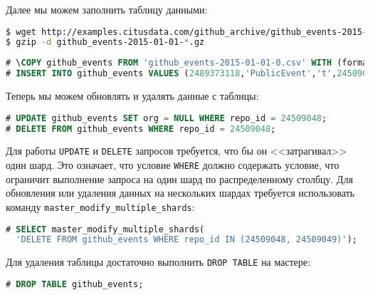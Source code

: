 Далее мы можем заполнить таблицу данными:

\begin{lstlisting}[language=Bash,label=lst:citus_hash3,caption=Загрузка данных]
$ wget http://examples.citusdata.com/github_archive/github_events-2015-01-01-{0..5}.csv.gz
$ gzip -d github_events-2015-01-01-*.gz
\end{lstlisting}

\begin{lstlisting}[language=SQL,label=lst:citus_hash4,caption=Загрузка данных]
# \COPY github_events FROM 'github_events-2015-01-01-0.csv' WITH (format CSV)
# INSERT INTO github_events VALUES (2489373118,'PublicEvent','t',24509048,'{}','{"id": 24509048, "url": "https://api.github.com/repos/SabinaS/csee6868", "name": "SabinaS/csee6868"}','{"id": 2955009, "url": "https://api.github.com/users/SabinaS", "login": "SabinaS", "avatar_url": "https://avatars.githubusercontent.com/u/2955009?", "gravatar_id": ""}',NULL,'2015-01-01 00:09:13');
\end{lstlisting}

Теперь мы можем обновлять и удалять данные с таблицы:

\begin{lstlisting}[language=SQL,label=lst:citus_hash5,caption=Изменение данных]
# UPDATE github_events SET org = NULL WHERE repo_id = 24509048;
# DELETE FROM github_events WHERE repo_id = 24509048;
\end{lstlisting}

Для работы \lstinline!UPDATE! и \lstinline!DELETE! запросов требуется, что бы он <<затрагивал>> один шард. Это означает, что условие \lstinline!WHERE! должно содержать условие, что ограничит выполнение запроса на один шард по распределенному столбцу. Для обновления или удаления данных на нескольких шардах требуется использовать команду \lstinline!master_modify_multiple_shards!:

\begin{lstlisting}[language=SQL,label=lst:citus_hash6,caption=Изменение данных на нескольких шардах]
# SELECT master_modify_multiple_shards(
  'DELETE FROM github_events WHERE repo_id IN (24509048, 24509049)');
\end{lstlisting}

Для удаления таблицы достаточно выполнить \lstinline!DROP TABLE! на мастере:

\begin{lstlisting}[language=SQL,label=lst:citus_hash7,caption=Удаление таблицы]
# DROP TABLE github_events;
\end{lstlisting}


